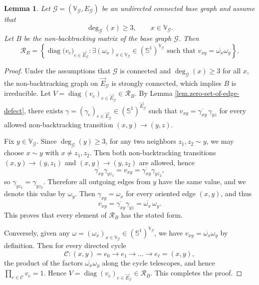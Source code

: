 \documentclass[11pt,twoside, a4paper]{article}
\numberwithin{equation}{section}
\numberwithin{figure}{section}
\theoremstyle{plain} %
\newtheorem{lemma}[theorem]{Lemma}
\theoremstyle{definition}
\theoremstyle{remark}
\newcommand{\1} {\mspace{1 mu}}
\newcommand{\2} {\mspace{2 mu}}
\DeclareMathOperator{\diag}{diag}
\begin{document}
    \begin{lemma}\label{lem.resonant-set-B}
    Let $\mathcal G=(\mathbb{V}_{\mathcal G},E_{\mathcal G})$ be an undirected connected base graph and assume that
    \[
    \deg_{\mathcal G}(x)\ge 3,\qquad x\in\mathbb V_{\mathcal G}.
    \]
    Let $B$ be the non-backtracking matrix of the base graph $\mathcal G$. Then
    \[
    \mathscr R_B
    =
    \left\{
    \operatorname{diag}\bigl(v_e\bigr)_{e\in\vec E_{\mathcal G}}
    :
    \exists(\omega_x)_{x\in \mathbb{V}_{\mathcal G}}\in (\mathbb S^1)^{\mathbb{V}_{\mathcal G}}
    \text{ such that }
    v_{xy}=\overline{\omega_x}\omega_y
    \right\}.
    \]
    \end{lemma}
    
    \begin{proof}
    Under the assumptions that \(\mathcal G\) is connected and
    \(\deg_{\mathcal G}(x)\ge 3\) for all \(x\), the non-backtracking graph on
    \(\vec E_{\mathcal G}\) is strongly connected, which implies \(B\) is irreducible.
    Let
    $
    V=\diag(v_e)_{e\in\vec E_{\mathcal G}}\in\mathscr R_B.
    $
    By Lemma \ref{lem.zero-set-of-edge-defect}, there exists $\gamma=(\gamma_{e})_{e\in\vec E_{\mathcal G}}\in (\mathbb S^1)^{\vec E_{\mathcal G}}$ such that
    $
    v_{xy}=\overline{\gamma_{xy}}\,\gamma_{yz}
    $
    for every allowed non-backtracking transition $(x,y)\to(y,z)$. 
    
    Fix $y\in \mathbb{V}_{\mathcal G}$. Since $\deg_{\mathcal G}(y)\ge 3$, for any two neighbors $z_1,z_2\sim y$, we may choose $x\sim y$ with
    $x\neq z_1,z_2$. Then both non-backtracking transitions $(x,y)\to(y,z_1)$ and $(x,y)\to(y,z_2)$ are allowed, hence
    \[
    \overline{\gamma_{xy}}\gamma_{yz_1}
    =
    v_{xy}
    =
    \overline{\gamma_{xy}}\gamma_{yz_2},
    \]
    so
    $
    \gamma_{yz_1}=\gamma_{yz_2}.
    $
    Therefore all outgoing edges from $y$ have the same value, and we denote this value by $\omega_y$.
    Then $\gamma_{xy}=\omega_x$ for every oriented edge $(x,y)$, and thus
    \[
    v_{xy}
    =
    \overline{\gamma_{xy}}\gamma_{yz}
    =
    \overline{\omega_x}\,\omega_y.
    \]
    This proves that every element of $\mathscr R_B$ has the stated form.
    
    Conversely, given any $\omega=(\omega_x)_{x\in\mathbb{V}_{\mathcal G}}\in (\mathbb{S}^1)^{\mathbb{V}_{\mathcal G}}$, we have
    $
    v_{xy}=\overline{\omega_x}\omega_y
    $
    by definition.
    Then for every directed cycle 
    \[
    \mathscr{C}:(x,y)=e_0\to e_1\to\dots\to e_\ell=(x,y),
    \]
    the product of the factors \(\overline{\omega_x}\omega_y\) along the cycle telescopes, and hence
    $
    \prod_{e\in\mathscr{C}}v_{e}=1.
    $
    Hence $V=\diag(v_e)_{e\in\vec E_{\mathcal G}}\in\mathscr R_B$. This completes the proof.
    \end{proof}
\end{document}
